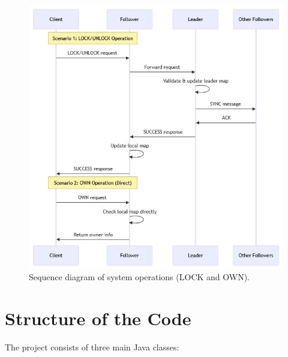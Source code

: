 \documentclass[a4paper,11pt]{article}
\begin{document}
\begin{figure}[htbp]
    \centering
    \includegraphics[width=0.85\linewidth]{images/mermaid.JPG}
    \caption{Sequence diagram of system operations (LOCK and OWN).}
    \label{fig:mermaid}
\end{figure}

\section{Structure of the Code}
The project consists of three main Java classes:
\end{document}
